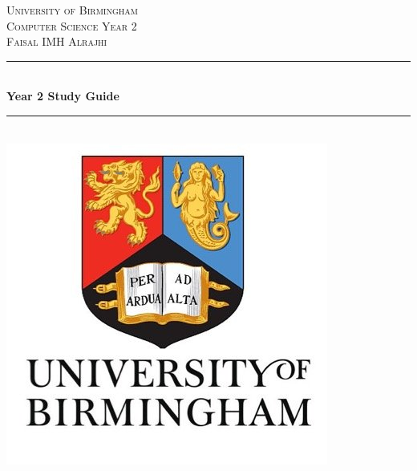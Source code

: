\documentclass[12pt, a4paper, oneside, titlepage]{report}
\begin{document}
		\begin{titlepage}
		\newcommand{\HRule}{\rule{\linewidth}{0.5mm}} %
		
		\center %
		
		
		\textsc{\LARGE University of Birmingham}\\[1.5cm] %
		\textsc{\Large Computer Science Year 2}\\[0.5cm] %
		\textsc{\Large Faisal IMH Alrajhi}\\[0.5cm]
		
		
		\HRule \\[0.4cm]
		{ \huge \bfseries Year 2 Study Guide}\\[0.4cm] %
		\HRule \\[1.5cm]
		
		
		\includegraphics[scale=0.75]{logo.png}\\[1cm] %
		
		
		\vfill %
		
	\end{titlepage}
\end{document}
